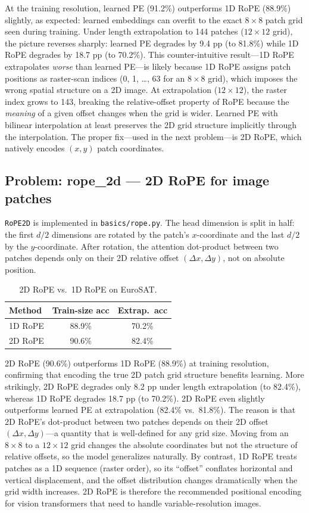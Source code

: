 \documentclass[11pt]{article}
\begin{document}
At the training resolution, learned PE (91.2\%) outperforms 1D RoPE (88.9\%)
slightly, as expected: learned embeddings can overfit to the exact $8\times8$
patch grid seen during training. Under length extrapolation to 144 patches
($12\times12$ grid), the picture reverses sharply: learned PE degrades by
9.4 pp (to 81.8\%) while 1D RoPE degrades by 18.7 pp (to 70.2\%). This
counter-intuitive result---1D RoPE extrapolates \emph{worse} than learned
PE---is likely because 1D RoPE assigns patch positions as raster-scan indices
(0, 1, \ldots, 63 for an $8\times8$ grid), which imposes the wrong spatial
structure on a 2D image. At extrapolation ($12\times12$), the raster index
grows to 143, breaking the relative-offset property of RoPE because the
\emph{meaning} of a given offset changes when the grid is wider.  Learned PE
with bilinear interpolation at least preserves the 2D grid structure implicitly
through the interpolation. The proper fix---used in the next problem---is
2D RoPE, which natively encodes $(x, y)$ patch coordinates.

\subsection*{Problem: rope\_2d --- 2D RoPE for image patches}

\texttt{RoPE2D} is implemented in \texttt{basics/rope.py}. The head
dimension is split in half: the first $d/2$ dimensions are rotated by the
patch's $x$-coordinate and the last $d/2$ by the $y$-coordinate. After
rotation, the attention dot-product between two patches depends only on
their 2D relative offset $(\Delta x, \Delta y)$, not on absolute position.

\begin{table}[H]
\centering
\caption{2D RoPE vs.\ 1D RoPE on EuroSAT.}
\begin{tabular}{lcc}
\toprule
Method & Train-size acc & Extrap.\ acc \\
\midrule
1D RoPE & 88.9\% & 70.2\% \\
2D RoPE & 90.6\% & 82.4\% \\
\bottomrule
\end{tabular}
\end{table}

2D RoPE (90.6\%) outperforms 1D RoPE (88.9\%) at training resolution,
confirming that encoding the true 2D patch grid structure benefits learning.
More strikingly, 2D RoPE degrades only 8.2 pp under length extrapolation
(to 82.4\%), whereas 1D RoPE degrades 18.7 pp (to 70.2\%). 2D RoPE even
slightly outperforms learned PE at extrapolation (82.4\% vs.\ 81.8\%).
The reason is that 2D RoPE's dot-product between two patches depends on their
2D offset $(\Delta x, \Delta y)$---a quantity that is well-defined for any
grid size. Moving from an $8\times8$ to a $12\times12$ grid changes the
absolute coordinates but not the structure of relative offsets, so the model
generalizes naturally. By contrast, 1D RoPE treats patches as a 1D sequence
(raster order), so its ``offset'' conflates horizontal and vertical
displacement, and the offset distribution changes dramatically when the grid
width increases.  2D RoPE is therefore the recommended positional encoding
for vision transformers that need to handle variable-resolution images.
\end{document}
